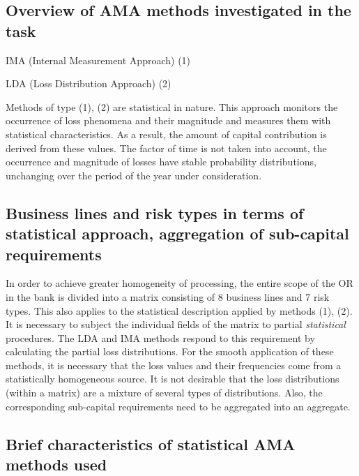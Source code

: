 \documentclass{article}
\begin{document}
\subsection{Overview of AMA methods investigated in the task}

\begin{compactitem}
\item IMA (Internal Measurement Approach)				(1)
\item LDA (Loss Distribution Approach)				(2)
\end{compactitem}

Methods of type (1), (2) are statistical in nature. This approach monitors the occurrence of loss phenomena and their magnitude and measures them with statistical characteristics. As a result, the amount of capital contribution is derived from these values. The factor of time is not taken into account, the occurrence and magnitude of losses have stable probability distributions, unchanging over the period of the year under consideration.


\subsection{Business lines and risk types in terms of statistical approach, aggregation of sub-capital requirements}

In order to achieve greater homogeneity of processing, the entire scope of the OR in the bank is divided into a matrix consisting of 8 business lines and 7 risk types. This also applies to the statistical description applied by methods (1), (2). It is necessary to subject the individual fields of the matrix to partial \emph{statistical} procedures. The LDA and IMA methods respond to this requirement by calculating the partial loss distributions. For the smooth application of these methods, it is necessary that the loss values and their frequencies come from a statistically homogeneous source. It is not desirable that the loss distributions (within a matrix) are a mixture of several types of distributions. Also, the corresponding sub-capital requirements need to be aggregated into an aggregate.

\subsection{Brief characteristics of statistical AMA methods used}
\end{document}
